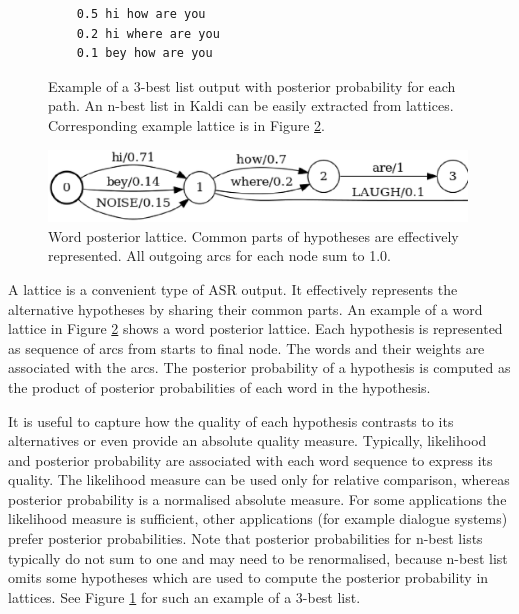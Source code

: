 \begin{figure}[!htp]
  \begin{center}
\begin{verbatim}
    0.5 hi how are you
    0.2 hi where are you
    0.1 bey how are you
\end{verbatim}
\caption{Example of a 3-best list output with posterior probability for each path. An n-best list in Kaldi can be easily extracted from lattices. Corresponding example lattice is in Figure \ref{fig:toy_lat}.}
\label{fig:nbest} 
  \end{center}
\end{figure}


\begin{figure}[!htp]
  \begin{center}
    \includegraphics[width=30em]{images/toy_lattice.ps}
    \caption{Word posterior lattice. 
      Common parts of hypotheses are effectively represented. 
      All outgoing arcs for each node sum to 1.0. }
    \label{fig:toy_lat} 
  \end{center}
\end{figure}


A lattice is a convenient type of \ac{ASR} output. It effectively represents the alternative hypotheses by sharing their common parts. An example of a word lattice in Figure \ref{fig:toy_lat} shows a word posterior lattice. Each hypothesis is represented as sequence of arcs from starts to final node. The words and their weights are associated with the arcs. The posterior probability of a hypothesis is computed as the product of posterior probabilities of each word in the hypothesis.

It is useful to capture how the quality of each hypothesis contrasts to its alternatives or even provide an absolute quality measure. Typically, likelihood and posterior probability are associated with each word sequence to express its quality. The likelihood measure can be used only for relative comparison, whereas posterior probability is a normalised absolute measure. For some applications the likelihood measure is sufficient, other applications (for example dialogue systems) prefer posterior probabilities. Note that posterior probabilities for n-best lists typically do not sum to one and may need to be renormalised, because n-best list omits some hypotheses which are used to compute the posterior probability in lattices. See Figure \ref{fig:nbest} for such an example of a 3-best list.

